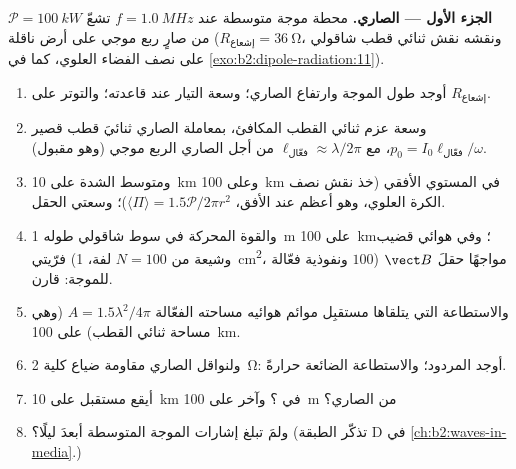 \begin{problem}
\label{pb:b2:dipole-radiation:1}

\medskip
\noindent\textbf{الجزء الأول --- الصاري.}
محطة موجة متوسطة عند $f = \qty{1.0}{MHz}$ تشعّ $\mathcal P = \qty{100}{kW}$
من صارٍ ربع موجي على أرض ناقلة ($R_{\text{إشعاع}} = \qty{36}{\ohm}$،
ونقشه نقش ثنائي قطب شاقولي على نصف الفضاء العلوي، كما في
\cref{exo:b2:dipole-radiation:11}).
\begin{enumerate}
  \item أوجد طول الموجة وارتفاع الصاري؛ وسعة التيار عند
        قاعدته؛ والتوتر على $R_{\text{إشعاع}}$.
  \item وسعة عزم ثنائي القطب المكافئ، بمعاملة الصاري
        ثنائيَ قطب قصير $p_0 = I_0\ell_{\text{فعّال}}/\omega$، مع $\ell_{\text{فعّال}} \approx
        \lambda/2\pi$ من أجل الصاري الربع موجي (وهو مقبول).
  \item ومتوسط الشدة على \qty{10}{km} وعلى \qty{100}{km} في المستوي
        الأفقي (خذ نقش نصف الكرة العلوي، وهو أعظم عند
        الأفق، $\langle\Pi\rangle = 1.5\mathcal P/2\pi r^2$)؛ وسعتي الحقل.
  \item والقوة المحركة في سوط شاقولي طوله \qty{1}{m} على \qty{100}{km}؛ وفي
        هوائي قضيب فرّيتي (وشيعة من $N = 100$ لفة، \qty{1}{cm^2}،
        ونفوذية فعّالة $100$) مواجهًا حقلَ $\vect B$ للموجة: قارن.
  \item والاستطاعة التي يتلقاها مستقبِل موائم هوائيه
        مساحته الفعّالة $A = 1.5\lambda^2/4\pi$ (وهي مساحة ثنائي القطب) على \qty{100}{km}.
  \item ولنواقل الصاري مقاومة ضياع كلية
        \qty{2}{\ohm}: أوجد المردود؛ والاستطاعة الضائعة حرارةً.
  \item أيقع مستقبل على \qty{10}{km} في ؟ وآخر على
        \qty{100}{m} من الصاري؟
  \item ولمَ تبلغ إشارات الموجة المتوسطة أبعدَ ليلًا؟ (تذكّر
        الطبقة D في \cref{ch:b2:waves-in-media}.)
\end{enumerate}


\end{problem}
